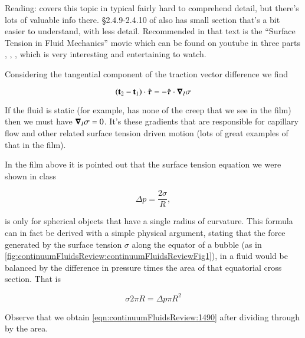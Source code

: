 Reading: \citep{landau1987course} covers this topic in typical fairly hard to comprehend detail, but there's lots of valuable info there.  \S 2.4.9-2.4.10 of \citep{granger1995fluid} also has small section that's a bit easier to understand, with less detail.  Recommended in that text is the ``Surface Tension in Fluid Mechanics'' movie which can be found on youtube in three parts , , , which is very interesting and entertaining to watch.


Considering the tangential component of the traction vector difference we find

\begin{equation}\label{eqn:continuumFluidsReview:2130}
(\mathbf{t}_2 - \mathbf{t}_1) \cdot \hat{\boldsymbol{\tau}} = - \hat{\boldsymbol{\tau}} \cdot \boldsymbol{\nabla}_I \sigma
\end{equation}

If the fluid is static (for example, has none of the creep that we see in the film) then we must have $\boldsymbol{\nabla}_I \sigma = 0$.  It's these gradients that are responsible for capillary flow and other related surface tension driven motion (lots of great examples of that in the film).


In the film above it is pointed out that the surface tension equation we were shown in class

\begin{equation}\label{eqn:continuumFluidsReview:1490}
\Delta p = \frac{2 \sigma}{R},
\end{equation}

is only for spherical objects that have a single radius of curvature.  This formula can in fact be derived with a simple physical argument, stating that the force generated by the surface tension $\sigma$ along the equator of a bubble (as in \ref{fig:continuumFluidsReview:continuumFluidsReviewFig1}), in a fluid would be balanced by the difference in pressure times the area of that equatorial cross section.  That is


\begin{equation}\label{eqn:continuumFluidsReview:1510}
\sigma 2 \pi R = \Delta p \pi R^2
\end{equation}

Observe that we obtain \ref{eqn:continuumFluidsReview:1490} after dividing through by the area.

